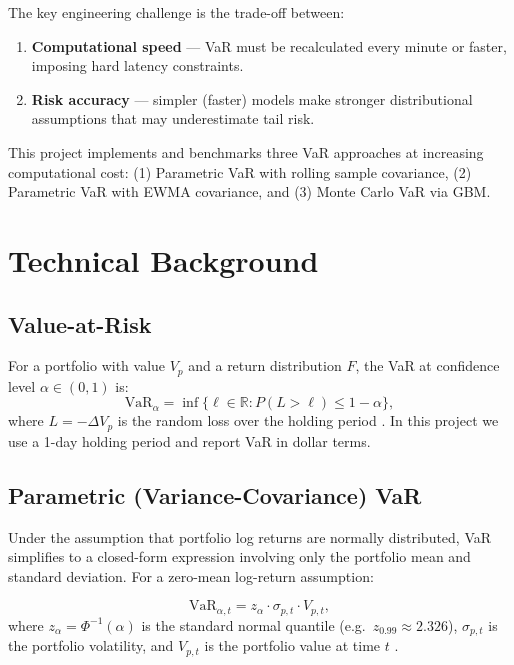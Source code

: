 \documentclass[12pt, a4paper]{article}
\newcommand{\VaR}{\mathrm{VaR}}
\begin{document}
The key engineering challenge is the trade-off between:
\begin{enumerate}
  \item \textbf{Computational speed} — VaR must be recalculated every
        minute or faster, imposing hard latency constraints.
  \item \textbf{Risk accuracy} — simpler (faster) models make stronger
        distributional assumptions that may underestimate tail risk.
\end{enumerate}

This project implements and benchmarks three VaR approaches at increasing
computational cost: (1) Parametric VaR with rolling sample covariance,
(2) Parametric VaR with EWMA covariance, and (3) Monte Carlo VaR via GBM.

\section{Technical Background}
\label{sec:background}

\subsection{Value-at-Risk}

For a portfolio with value $V_p$ and a return distribution $F$, the VaR
at confidence level $\alpha \in (0,1)$ is:
\begin{equation}
  \VaR_\alpha = \inf \{ \ell \in \mathbb{R} : P(L > \ell) \leq 1 - \alpha \},
  \label{eq:var_def}
\end{equation}
where $L = -\Delta V_p$ is the random loss over the holding period
\citep{mcneil2015}.  In this project we use a 1-day holding period and
report VaR in dollar terms.

\subsection{Parametric (Variance-Covariance) VaR}

Under the assumption that portfolio log returns are normally distributed,
VaR simplifies to a closed-form expression involving only the portfolio
mean and standard deviation.  For a zero-mean log-return assumption:

\begin{equation}
  \VaR_{\alpha,t} = z_\alpha \cdot \sigma_{p,t} \cdot V_{p,t},
  \label{eq:param_var}
\end{equation}
where $z_\alpha = \Phi^{-1}(\alpha)$ is the standard normal quantile
(e.g.\ $z_{0.99} \approx 2.326$), $\sigma_{p,t}$ is the portfolio
volatility, and $V_{p,t}$ is the portfolio value at time $t$
\citep{jorion2007}.
\end{document}
